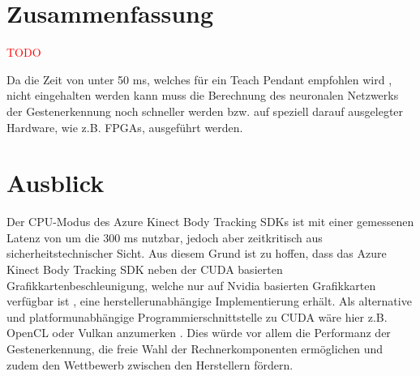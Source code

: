 \section{Zusammenfassung}

\textcolor{red}{TODO}







Da die Zeit von unter 50 ms, welches für ein Teach Pendant empfohlen wird \cite[55]{prassler_advances_2004}, nicht eingehalten werden kann  muss die Berechnung des neuronalen Netzwerks der Gestenerkennung noch schneller werden bzw. auf speziell darauf ausgelegter Hardware, wie z.B. FPGAs, ausgeführt werden.

\section{Ausblick}


Der CPU-Modus des Azure Kinect Body Tracking SDKs ist mit einer gemessenen Latenz von um die 300 ms nutzbar, jedoch aber zeitkritisch aus sicherheitstechnischer Sicht. Aus diesem Grund ist zu hoffen, dass das Azure Kinect Body Tracking SDK neben der CUDA basierten Grafikkartenbeschleunigung, welche nur auf Nvidia basierten Grafikkarten verfügbar ist \cite{encausse_body_nodate}, eine herstellerunabhängige Implementierung erhält. Als alternative und platformunabhängige Programmierschnittstelle zu CUDA wäre hier z.B. OpenCL oder Vulkan anzumerken \cite{vulkan_api_2020}. Dies würde vor allem die Performanz der Gestenerkennung, die freie Wahl der Rechnerkomponenten ermöglichen und zudem den Wettbewerb zwischen den Herstellern fördern.\\

